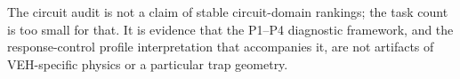 The circuit audit is not a claim of stable circuit-domain rankings; the task count is too small for that. It is evidence that the P1--P4 diagnostic framework, and the response-control profile interpretation that accompanies it, are not artifacts of VEH-specific physics or a particular trap geometry.
